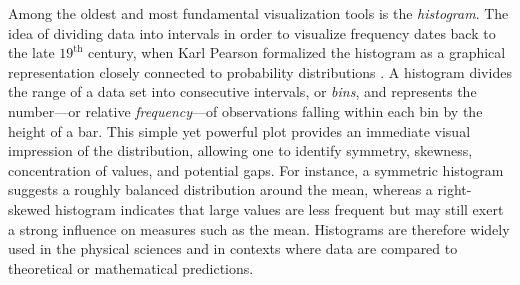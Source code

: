 Among the oldest and most fundamental visualization tools is the \textit{histogram}. The idea of dividing data into intervals in order to visualize frequency dates back to the late $19^{\text{th}}$ century, when Karl Pearson formalized the histogram as a graphical representation closely connected to probability distributions \cite{pearson_1892_grammar, pearson_1895_contributions}. A histogram divides the range of a data set into consecutive intervals, or \textit{bins}, and represents the number—or relative \textit{frequency}—of observations falling within each bin by the height of a bar. This simple yet powerful plot provides an immediate visual impression of the distribution, allowing one to identify symmetry, skewness, concentration of values, and potential gaps. For instance, a symmetric histogram suggests a roughly balanced distribution around the mean, whereas a right-skewed histogram indicates that large values are less frequent but may still exert a strong influence on measures such as the mean. Histograms are therefore widely used in the physical sciences and in contexts where data are compared to theoretical or mathematical predictions.

